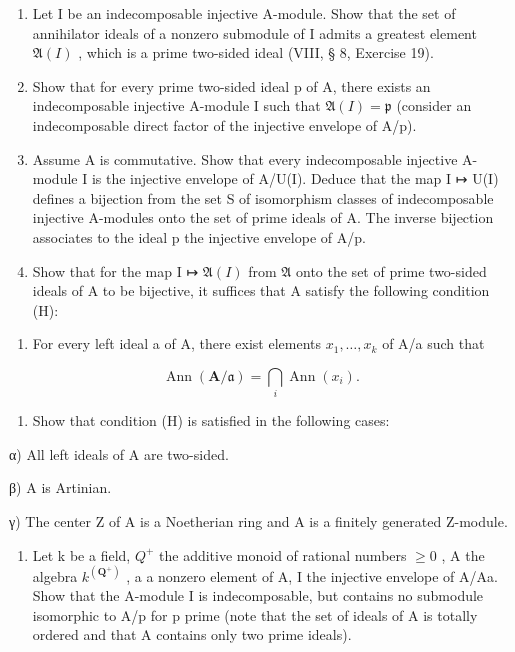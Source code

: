 \begin{enumerate}
\def\labelenumi{\alph{enumi})}
\item
  Let I be an indecomposable injective A-module. Show that the set of annihilator ideals of a nonzero submodule of I admits a greatest element \(\mathfrak{A}(I)\) , which is a prime two-sided ideal (VIII, § 8, Exercise 19).
\item
  Show that for every prime two-sided ideal p of A, there exists an indecomposable injective A-module I such that \(\mathfrak{A}(I) = \mathfrak{p}\) (consider an indecomposable direct factor of the injective envelope of A/p).
\item
  Assume A is commutative. Show that every indecomposable injective A-module I is the injective envelope of A/U(I). Deduce that the map I ↦ U(I) defines a bijection from the set S of isomorphism classes of indecomposable injective A-modules onto the set of prime ideals of A. The inverse bijection associates to the ideal p the injective envelope of A/p.
\item
  Show that for the map I ↦ \(\mathfrak{A}(I)\) from \(\mathfrak{A}\) onto the set of prime two-sided ideals of A to be bijective, it suffices that A satisfy the following condition (H):
\end{enumerate}

\begin{enumerate}
\def\labelenumi{(\Alph{enumi})}
\setcounter{enumi}{7}
\tightlist
\item
  For every left ideal a of A, there exist elements \(x_{1}, \ldots, x_{k}\) of A/a such that
\end{enumerate}

\[
\operatorname{Ann} (\mathbf {A} / \mathfrak {a}) = \bigcap_ {i} \operatorname{Ann} (x _ {i}).
\]

\begin{enumerate}
\def\labelenumi{\alph{enumi})}
\setcounter{enumi}{4}
\tightlist
\item
  Show that condition (H) is satisfied in the following cases:
\end{enumerate}

α) All left ideals of A are two-sided.

β) A is Artinian.

γ) The center Z of A is a Noetherian ring and A is a finitely generated Z-module.

\begin{enumerate}
\def\labelenumi{\alph{enumi})}
\setcounter{enumi}{5}
\tightlist
\item
  Let k be a field, \(Q^{+}\) the additive monoid of rational numbers \(\geqslant 0\) , A the algebra \(k^{(\mathbf{Q}^{+})}\) , a a nonzero element of A, I the injective envelope of A/Aa. Show that the A-module I is indecomposable, but contains no submodule isomorphic to A/p for p prime (note that the set of ideals of A is totally ordered and that A contains only two prime ideals).
\end{enumerate}

